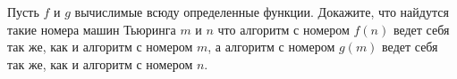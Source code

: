 Пусть $f$ и $g$ вычислимые всюду определенные функции. Докажите, что найдутся такие номера машин Тьюринга $m$ и  $n$ что
алгоритм с номером $f(n)$ ведет себя так же, как и алгоритм с номером $m$, а алгоритм с номером $g(m)$ ведет себя так же, как
и алгоритм с номером $n$.